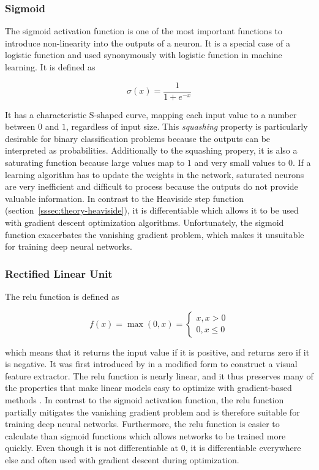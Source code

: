 \documentclass[draft,final]{vutinfth} %
\begin{document}
\subsubsection{Sigmoid}
\label{sssec:theory-sigmoid}

The sigmoid activation function is one of the most important functions
to introduce non-linearity into the outputs of a neuron. It is a
special case of a logistic function and used synonymously with
logistic function in machine learning. It is defined as

\begin{equation}
  \label{eq:sigmoid}
  \sigma(x) = \frac{1}{1 + e^{-x}}
\end{equation}

It has a characteristic S-shaped curve, mapping each input value to a
number between $0$ and $1$, regardless of input size. This
\emph{squashing} property is particularly desirable for binary
classification problems because the outputs can be interpreted as
probabilities. Additionally to the squashing propery, it is also a
saturating function because large values map to $1$ and very small
values to $0$. If a learning algorithm has to update the weights in
the network, saturated neurons are very inefficient and difficult to
process because the outputs do not provide valuable information. In
contrast to the Heaviside step function
(section~\ref{sssec:theory-heaviside}), it is differentiable which
allows it to be used with gradient descent optimization
algorithms. Unfortunately, the sigmoid function exacerbates the
vanishing gradient problem, which makes it unsuitable for training
deep neural networks.

\subsubsection{Rectified Linear Unit}
\label{sssec:theory-relu}

The \gls{relu} function is defined as

\begin{equation}
  \label{eq:relu}
  f(x) = \max(0, x) =
  \begin{cases}
    x, x > 0 \\
    0, x \leq 0
  \end{cases}
\end{equation}

which means that it returns the input value if it is positive, and
returns zero if it is negative. It was first introduced by
\textcite{fukushima1969} in a modified form to construct a visual
feature extractor. The \gls{relu} function is nearly linear, and it
thus preserves many of the properties that make linear models easy to
optimize with gradient-based methods \cite{goodfellow2016}. In
contrast to the sigmoid activation function, the \gls{relu} function
partially mitigates the vanishing gradient problem and is therefore
suitable for training deep neural networks. Furthermore, the
\gls{relu} function is easier to calculate than sigmoid functions
which allows networks to be trained more quickly. Even though it is
not differentiable at $0$, it is differentiable everywhere else and
often used with gradient descent during optimization.
\end{document}
